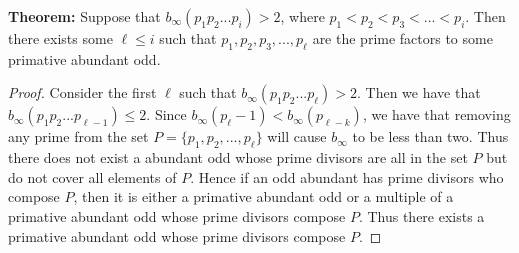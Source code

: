 \documentclass[../paper.tex]{subfiles}
\begin{document}
%
%
%
%
%




\textbf{Theorem:} Suppose that $b_{\infty}(p_1 p_2 ... p_i) > 2$,
where $p_1 < p_2 < p_3 < ... < p_i$. Then there exists some 
$\ell \leq i$ such that $p_1, p_2, p_3, ..., p_\ell$ are the prime
factors to some primative abundant odd.

\begin{proof}
	Consider the first $\ell$ such that $b_{\infty}(
p_1 p_2 ... p_\ell) > 2$. Then we have that $b_{\infty}(p_1 p_2 
... p_{\ell - 1}) \leq 2$. Since 
$b_{\infty}(p_\ell - 1) < b_{\infty}(p_{\ell - k})$, we have that
removing any prime from the set $P = \{p_1, p_2, ..., p_{\ell} \}$ will
cause $b_{\infty}$ to be less than two. Thus there does not exist
a abundant odd whose prime divisors are all in the set 
$P$ but do not cover all elements of $P$. Hence if an odd abundant
has prime divisors who compose $P$, then it is either a primative 
abundant odd or a multiple of a primative abundant odd whose prime
divisors compose $P$. Thus there exists a primative abundant odd
whose prime divisors compose $P$.
\end{proof}
\end{document}
